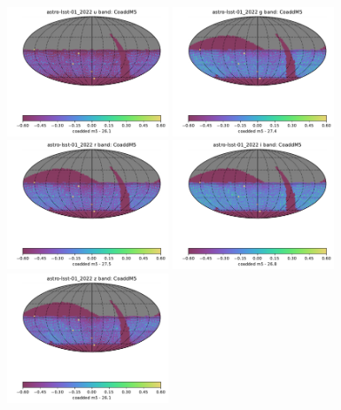 \documentclass[DM,authoryear,toc]{lsstdoc}
\begin{document}
\begin{figure}[ht]
\centering
\includegraphics[width=0.43\textwidth]{figures/astro-lsst-01_2022_CoaddM5_u_band_HEAL_SkyMap}
\includegraphics[width=0.43\textwidth]{figures/astro-lsst-01_2022_CoaddM5_g_band_HEAL_SkyMap} \\
\includegraphics[width=0.43\textwidth]{figures/astro-lsst-01_2022_CoaddM5_r_band_HEAL_SkyMap}
\includegraphics[width=0.43\textwidth]{figures/astro-lsst-01_2022_CoaddM5_i_band_HEAL_SkyMap}  \\
\includegraphics[width=0.43\textwidth]{figures/astro-lsst-01_2022_CoaddM5_z_band_HEAL_SkyMap}

\end{figure}
\end{document}
